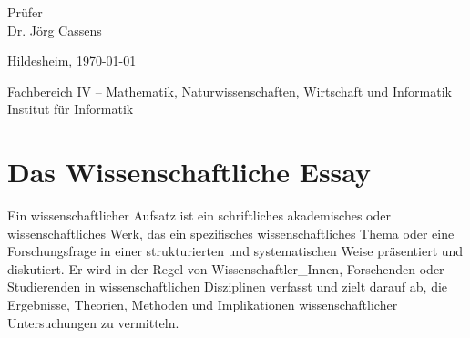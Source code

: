 \documentclass[12pt,        %
  english,ngerman,          %
  paper=a4,                 %
  captions=tablesignature,  %
  listof=numbered,          %
  bibliography=totoc,       %
  headings=small,           %
  headinclude=false,        %
  footinclude=false,        %
  parskip=half-,            %
  oneside,                  %
  DIV=12                    %
  ]{scrartcl}                %
\begin{document}
\begin{titlepage}
\begin{center}
{      \vfill

      Prüfer\\
      Dr. Jörg Cassens
  
      \vfill
      
      Hildesheim, \today
    }
      
      \vfill
      
    {
      \footnotesize 

      \vfill

      Fachbereich IV -- Mathematik, Naturwissenschaften, Wirtschaft und Informatik\\      
      Institut für Informatik
    }
  \end{center}
\end{titlepage}


\section{Das Wissenschaftliche Essay}\label{section:essay}



Ein wissenschaftlicher Aufsatz ist ein schriftliches akademisches oder wissenschaftliches Werk, das ein spezifisches wissenschaftliches Thema oder eine Forschungsfrage in einer strukturierten und systematischen Weise präsentiert und diskutiert. Er wird in der Regel von Wissenschaftler\_Innen, Forschenden oder Studierenden in wissenschaftlichen Disziplinen verfasst und zielt darauf ab, die Ergebnisse, Theorien, Methoden und Implikationen wissenschaftlicher Untersuchungen zu vermitteln.
\end{document}
